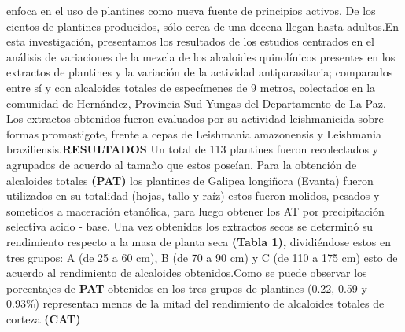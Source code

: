 \documentclass{article}
\begin{document}
{enfoca en el uso de plantines como nueva fuente de principios activos. De los cientos de plantines producidos, sólo cerca de una decena llegan hasta adultos.}{En esta investigación, presentamos los resultados de los estudios centrados en el análisis de variaciones de la mezcla de los alcaloides quinolínicos presentes en los extractos de plantines y la variación de la actividad antiparasitaria; comparados entre sí y con alcaloides totales de especímenes de 9 metros, colectados en la comunidad de Hernández, Provincia Sud Yungas del Departamento de La Paz. Los extractos obtenidos fueron evaluados por su actividad leishmanicida sobre formas promastigote, frente a cepas de Leishmania amazonensis y Leishmania braziliensis.}{\renewcommand{\children}{RESULTADOS}\textbf{\children}
}{Un total de 113 plantines fueron recolectados y agrupados de acuerdo al tamaño que estos poseían. Para la obtención de alcaloides totales \renewcommand{\children}{(PAT) }\textbf{\children}
los plantines de Galipea longiñora (Evanta) fueron utilizados en su totalidad (hojas, tallo y raíz) estos fueron molidos, pesados y sometidos a maceración etanólica, para luego obtener los AT por precipitación selectiva acido - base. Una vez obtenidos los extractos secos se determinó su rendimiento respecto a la masa de planta seca \renewcommand{\children}{(Tabla 1), }\textbf{\children}
dividiéndose estos en tres grupos: A (de 25 a 60 cm), B (de 70 a 90 cm) y C (de 110 a 175 cm) esto de acuerdo al rendimiento de alcaloides obtenidos.}{Como se puede observar los porcentajes de \renewcommand{\children}{PAT }\textbf{\children}
obtenidos en los tres grupos de plantines (0.22, 0.59 y 0.93\%) representan menos de la mitad del rendimiento de alcaloides totales de corteza \renewcommand{\children}{(CAT) }\textbf{\children}
}
\end{document}
